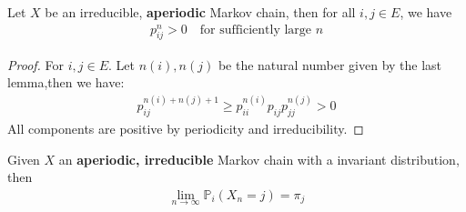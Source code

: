 \begin{corollary}
	Let $X$ be an irreducible, \textbf{aperiodic }Markov chain, then for all $i, j \in E$, we have
	\begin{align*}
		p_{ij}^n > 0 \quad \text{for sufficiently large $n$}
	\end{align*}
\end{corollary}
\begin{proof}
	For $i, j \in E$. Let $n(i), n(j)$ be the natural number given by the last lemma,then we have:
	\begin{align*}
		p_{ij}^{n(i) + n(j) + 1} \ge p_{ii}^{n(i)} p_{ij} p_{jj}^{n(j)}>0
	\end{align*}
	All components are positive by periodicity and irreducibility.
\end{proof}

\begin{theorem}
	Given $X$ an \textbf{aperiodic, irreducible} Markov chain with a invariant distribution, then
	\begin{align*}
		\lim_{n \rightarrow \infty}\mathbb{P}_i (X_n = j) = \pi_j
	\end{align*}
\end{theorem}
